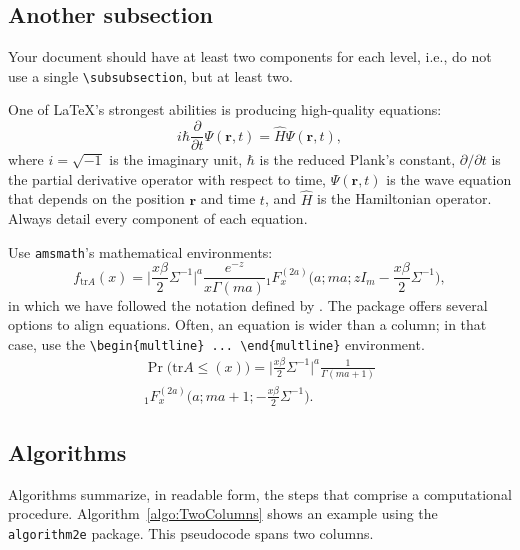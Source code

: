 \documentclass[conference,a4paper]{IEEEtran}
\begin{document}
\subsection{Another subsection}

Your document should have at least two components for each level, i.e., do not use a single \verb|\subsubsection|, but at least two.

One of \LaTeX's strongest abilities is producing high-quality equations:
\begin{equation}
	i\hbar \frac{\partial}{\partial t} \Psi(\bm{r}, t) = \widehat{H} \Psi(\bm{r}, t),
\end{equation}
where $i=\sqrt{-1}$ is the imaginary unit,
$\hbar$ is the reduced Plank's constant,
${\partial}/{\partial t}$ is the partial derivative operator with respect to time,
$\Psi(\bm{r}, t)$ is the wave equation that depends on the position $\bm r$ and time $t$, and
$\widehat{H}$ is the Hamiltonian operator.
Always detail every component of each equation.

Use \verb|amsmath|'s mathematical environments:
\begin{equation}
	f_{\text{tr} A}(x) =
	\Big| \frac{x\beta}{2} \Sigma^{-1} \Big|^a
	\frac{e^{-z}}{x\Gamma(ma)} {}_1F_x^{(2a)} 
	\Big(a;ma;z I_m - \frac{x\beta}{2}\Sigma^{-1}\Big),
\end{equation}
in which we have followed the notation defined by \citet{TheDensitiesandDistributionsoftheLargestEigenvalueandtheTraceofaBetaWishartMatrix}.
The package offers several options to align equations.
Often, an equation is wider than a column; in that case, use the \verb|\begin{multline} ... \end{multline}| environment.
\begin{multline}
	\Pr\big(\text{tr} A \leq (x)\big) =
	\Big| \frac{x\beta}{2} \Sigma^{-1} \Big|^a
	\frac{1}{\Gamma(ma+1)} \\ 
	{}_1F_x^{(2a)} \Big(a;ma+1;- \frac{x\beta}{2}\Sigma^{-1}\Big).
\end{multline}

\subsection{Algorithms}

Algorithms summarize, in readable form, the steps that comprise a computational procedure.
Algorithm~\ref{algo:TwoColumns} shows an example using the \verb|algorithm2e| package.
This pseudocode spans two columns.
\end{document}
